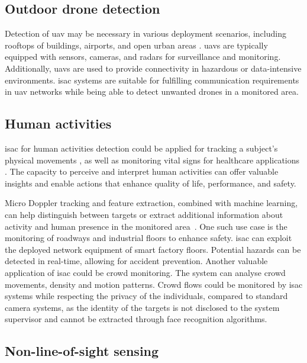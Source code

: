 	\subsection{Outdoor drone detection}
	
	Detection of \gls{uav} may be necessary in various deployment scenarios, including rooftops of buildings, airports, and open urban areas \cite{Mandelli_Henninger_Bauhofer_Wild_2023}.
	\glspl{uav} are typically equipped with sensors, cameras, and radars for surveillance and monitoring. Additionally, \glspl{uav} are used to provide connectivity in hazardous or data-intensive environments.
	\gls{isac} systems are suitable for fulfilling communication requirements in \gls{uav} networks while being able to detect unwanted drones in a monitored area.
	
	\subsection{Human activities}
	
	\Gls{isac} for human activities detection could be applied for tracking a subject's physical movements \cite{wifi_human_detection}, as well as monitoring vital signs for healthcare applications \cite{vital_signs_monitoring}. 
	The capacity to perceive and interpret human activities can offer valuable insights and enable actions that enhance quality of life, performance, and safety.
	
	Micro Doppler tracking and feature extraction, combined with machine learning, can help distinguish between targets or extract additional information about activity and human presence in the monitored area~\cite{Zhao_tracking_identifying_people_mmWave}.	
	One such use case is the monitoring of roadways and industrial floors to enhance safety. \Gls{isac} can exploit the deployed network equipment of smart factory floors. Potential hazards can be detected in real-time, allowing for accident prevention. 
	Another valuable application of \gls{isac} could be crowd monitoring. 
	The system can analyse crowd movements, density and motion patterns. 
	Crowd flows could be monitored by \gls{isac} systems while respecting the privacy of the individuals, compared to standard camera systems, as the identity of the targets is not disclosed to the system supervisor and cannot be extracted through face recognition algorithms.

	
	\subsection{Non-line-of-sight sensing}
	
